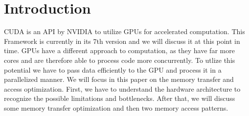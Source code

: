 \section{Introduction}
\label{sec:intro}
CUDA is an API by NVIDIA to utilize GPUs for accelerated computation.
This Framework is currently in its 7th version and we will discuss it at this point in time.
GPUs have a different approach to computation, 
as they have far more cores and are therefore able to process code more concurrently.
To utlize this potential we have to pass data efficiently to the GPU and process it in a parallelized manner.
We will focus in this paper on the memory transfer and access optimization.
First, we have to understand the hardware architecture to recognize the possible limitations and bottlenecks.
After that, we will discuss some memory transfer optimization and then two memory access patterns.
